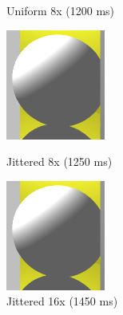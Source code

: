 \begin{figure}[H]
    \caption{Uniform 8x (1200 ms)}
    \label{fig:aa_uniform_zoom}
\endminipage\hfill
{}
    \centering
    \includegraphics[width=\linewidth]{img/antialiasing/sto8x.png}
    \caption{Jittered 8x (1250 ms)}
\endminipage\hfill
{}
    \centering
    \includegraphics[width=\linewidth]{img/antialiasing/sto16x.png}
    \caption{Jittered 16x (1450 ms)}
\endminipage\hfill
\end{figure}

